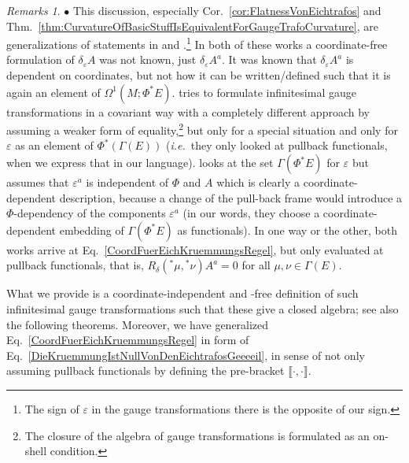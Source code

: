 \documentclass[a4paper,oneside,11pt,leqno]{scrartcl} %
\theoremstyle{plain}
\theoremstyle{remark}
\newtheorem{remark}[theorem]{Remarks}
\theoremstyle{definition}
\begin{document}
\begin{remark}\label{RemarkUeberNablaRhoCurvatureForGauegTrafo}
\leavevmode\newline
\indent $\bullet$ This discussion, especially Cor.~\ref{cor:FlatnessVonEichtrafos} and Thm.~\ref{thm:CurvatureOfBasicStuffIsEquivalentForGaugeTrafoCurvature}, are generalizations of statements in \cite[especially Prop.~8 and Thm.~1]{EichtrafoKruemmungUrspruenglich} and \cite[especially Eq.~9, 10 and 11; there the $S$ denotes the basic curvature]{mayerlieAuchEichtrafoStuff}.\footnote{The sign of $\varepsilon$ in the gauge transformations there is the opposite of our sign.} In both of these works a coordinate-free formulation of $\delta_\varepsilon A$ was not known, just $\delta_\varepsilon A^a$. It was known that $\delta_\varepsilon A^a$ is dependent on coordinates, but not how it can be written/defined such that it is again an element of $\Omega^1(M; \Phi^*E)$. \cite{EichtrafoKruemmungUrspruenglich} tries to formulate infinitesimal gauge transformations in a covariant way with a completely different approach by assuming a weaker form of equality,\footnote{The closure of the algebra of gauge transformations is formulated as an on-shell condition.} but only for a special situation and only for $\varepsilon$ as an element of $\Phi^*(\Gamma(E))$ (\textit{i.e.}~they only looked at pullback functionals, when we express that in our language). \cite{mayerlieAuchEichtrafoStuff} looks at the set $\Gamma(\Phi^*E)$ for $\varepsilon$ but assumes that $\varepsilon^a$ is independent of $\Phi$ and $A$ which is clearly a coordinate-dependent description, because a change of the pull-back frame would introduce a $\Phi$-dependency of the components $\varepsilon^a$ (in our words, they choose a coordinate-dependent embedding of $\Gamma(\Phi^*E)$ as functionals). In one way or the other, both works arrive at Eq.~\eqref{CoordFuerEichKruemmungsRegel}, but only evaluated at pullback functionals, that is, $R_\delta({}^*\mu, {}^*\nu)A^a=0$ for all $\mu, \nu \in \Gamma(E)$.

What we provide is a coordinate-independent and -free definition of such infinitesimal gauge transformations such that these give a closed algebra; see also the following theorems. Moreover, we have generalized Eq.~\eqref{CoordFuerEichKruemmungsRegel} in form of Eq.~\eqref{DieKruemmungIstNullVonDenEichtrafosGeeeeil}, in sense of not only assuming pullback functionals by defining the pre-bracket $\llbracket \cdot, \cdot \rrbracket$.


\end{remark}
\end{document}
